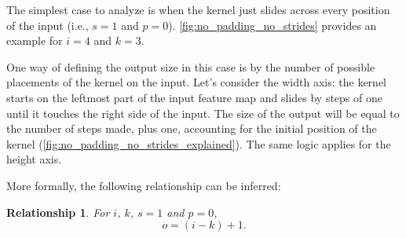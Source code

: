 \documentclass[notitlepage]{report}
\newtheorem{relationship}{Relationship}
\begin{document}
The simplest case to analyze is when the kernel just slides across every
position of the input (i.e., $s = 1$ and $p = 0$).
\autoref{fig:no_padding_no_strides} provides an example for $i = 4$ and $k =
3$.

One way of defining the output size in this case is by the number of possible
placements of the kernel on the input. Let's consider the width axis: the kernel
starts on the leftmost part of the input feature map and slides by steps of one
until it touches the right side of the input. The size of the output will be
equal to the number of steps made, plus one, accounting for the initial position
of the kernel (\autoref{fig:no_padding_no_strides_explained}). The same logic
applies for the height axis.

More formally, the following relationship can be inferred:

\begin{relationship}\label{rel:no_padding_no_strides}
For $i$, $k$, $s = 1$ and $p = 0$,
\begin{equation*}
    o = (i - k) + 1.
\end{equation*}
\end{relationship}
\end{document}
